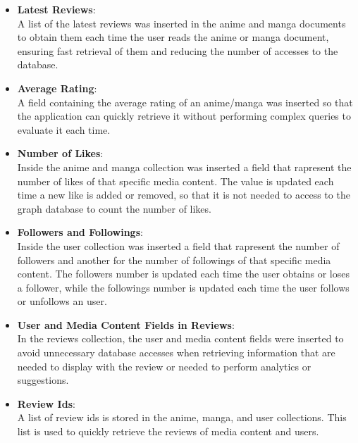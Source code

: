 \begin{itemize}
    \item \textbf{Latest Reviews}: \\
    A list of the latest reviews was inserted in the anime and manga documents to obtain them each time the user reads
    the anime or manga document, ensuring fast retrieval of them and reducing the number of accesses to the database.

    \vspace{\baselineskip}

    \newpage

    \item \textbf{Average Rating}: \\
    A field containing the average rating of an anime/manga was inserted so that the application can quickly retrieve it
    without performing complex queries to evaluate it each time.

    \vspace{\baselineskip}

    \item \textbf{Number of Likes}: \\
    Inside the anime and manga collection was inserted a field that rapresent the number of likes of that specific media content.
    The value is updated each time a new like is added or removed, so that it is not needed to access to the graph database to
    count the number of likes.

    \vspace{\baselineskip}

    \item \textbf{Followers and Followings}: \\
    Inside the user collection was inserted a field that rapresent the number of followers and another for the number of followings
    of that specific media content. The followers number is updated each time the user obtains or loses a follower, while the followings
    number is updated each time the user follows or unfollows an user.

    \vspace{\baselineskip}

    \item \textbf{User and Media Content Fields in Reviews}: \\
    In the reviews collection, the user and media content fields were inserted to avoid unnecessary database accesses when retrieving
    information that are needed to display with the review or needed to perform analytics or suggestions.

    \vspace{\baselineskip}

    \item \textbf{Review Ids}: \\
    A list of review ids is stored in the anime, manga, and user collections. This list is used to 
    quickly retrieve the reviews of media content and users.
\end{itemize}

